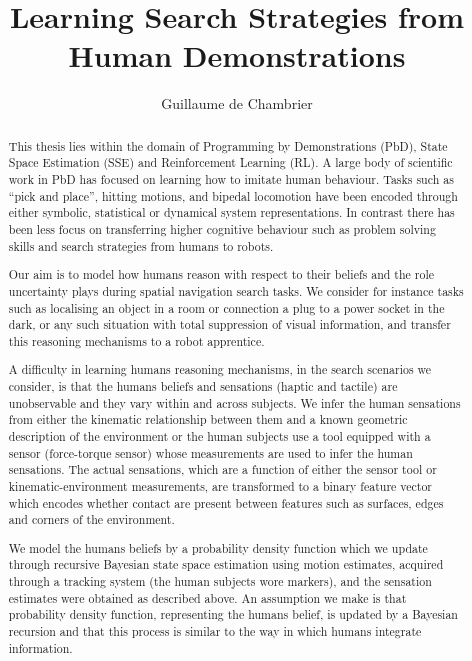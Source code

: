 \documentclass[a4paper,10pt]{article}
\title{Learning Search Strategies from Human Demonstrations}
\author{Guillaume de Chambrier}
\begin{document}
\maketitle

\begin{abstract}
 
This thesis lies within the domain of Programming by Demonstrations (PbD), State Space Estimation (SSE) and Reinforcement Learning (RL). A large body of scientific work in PbD has focused on learning how to imitate human behaviour. Tasks such as ``pick and place'', 
hitting motions, and bipedal locomotion have been encoded through either symbolic, statistical or dynamical system representations. 
In contrast there has been less focus on transferring higher cognitive behaviour such as problem solving skills and search strategies 
from humans to robots. 

Our aim is to model how humans reason with respect to their beliefs and the role uncertainty plays during spatial navigation search tasks. 
We consider for instance tasks such as localising  an object in a room or connection a plug to a power socket in the dark, 
or any such situation with total suppression of visual information, and transfer this reasoning mechanisms to a robot apprentice. 

A difficulty in learning humans reasoning mechanisms, in the search scenarios we consider, is that the humans 
beliefs and sensations (haptic and tactile) are unobservable and they vary within and across subjects. 
We infer the human sensations from either the kinematic relationship between them and a known geometric description of 
the environment or the human subjects use a tool equipped with a sensor (force-torque sensor) whose measurements 
are used to infer the human sensations. The actual sensations, which are a function of either the sensor tool or kinematic-environment 
measurements, are transformed to a binary feature vector which encodes whether contact are present between features such as 
surfaces, edges and corners of the environment. 

We model the humans beliefs by a probability density function which we update through recursive Bayesian 
state space estimation using motion estimates, acquired through a tracking system (the human subjects wore markers), 
and the sensation estimates were obtained as described above. An assumption we make is that probability 
density function, representing the humans belief, is updated by a Bayesian recursion 
and that this process is similar to the way in which humans integrate information.


\end{abstract}
\end{document}
